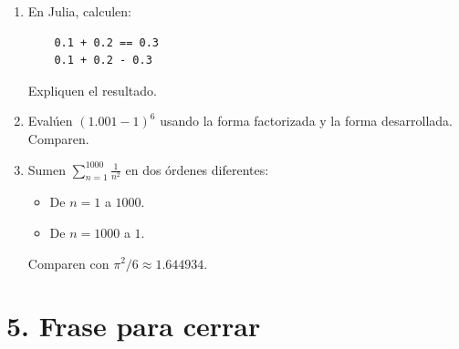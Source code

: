 \documentclass[12pt,letterpaper]{article}
\begin{document}
\begin{enumerate}
    \item En Julia, calculen:
    \begin{verbatim}
    0.1 + 0.2 == 0.3
    0.1 + 0.2 - 0.3
    \end{verbatim}
    Expliquen el resultado.

    \item Evalúen $(1.001 - 1)^6$ usando la forma factorizada y la forma desarrollada. Comparen.

    \item Sumen $\sum_{n=1}^{1000} \frac{1}{n^2}$ en dos órdenes diferentes:
    \begin{itemize}
        \item De $n=1$ a $1000$.
        \item De $n=1000$ a $1$.
    \end{itemize}
    Comparen con $\pi^2/6 \approx 1.644934$.
\end{enumerate}

\section*{5. Frase para cerrar}

\begin{center}
\end{center}
\end{document}
